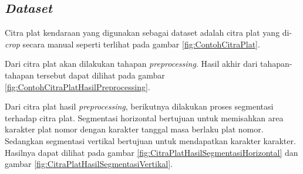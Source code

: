 \subsection{\textit{Dataset}}
\noindent Citra plat kendaraan yang digunakan sebagai dataset adalah citra plat yang di-\textit{crop} secara manual seperti terlihat pada gambar \ref{fig:ContohCitraPlat}.

\begin{adjustbox}{width=1\textwidth}
	\noindent
	\begin{minipage}{\linewidth}
		\label{fig:ContohCitraPlat}
	\end{minipage}
\end{adjustbox}

\noindent Dari citra plat akan dilakukan tahapan \textit{preprocessing}. Hasil akhir dari tahapan-tahapan tersebut dapat dilihat pada gambar \ref{fig:ContohCitraPlatHasilPreprocessing}.

\begin{adjustbox}{width=1\textwidth}
	\noindent\begin{minipage}{\linewidth}
		\label{fig:ContohCitraPlatHasilPreprocessing}
	\end{minipage}
\end{adjustbox}

\noindent Dari citra plat hasil \textit{preprocessing}, berikutnya dilakukan proses segmentasi terhadap citra plat. Segmentasi horizontal bertujuan untuk memisahkan area karakter plat nomor dengan karakter tanggal masa berlaku plat nomor. Sedangkan segmentasi vertikal bertujuan untuk mendapatkan karakter karakter. Hasilnya dapat dilihat pada gambar \ref{fig:CitraPlatHasilSegmentasiHorizontal} dan gambar \ref{fig:CitraPlatHasilSegmentasiVertikal}.

